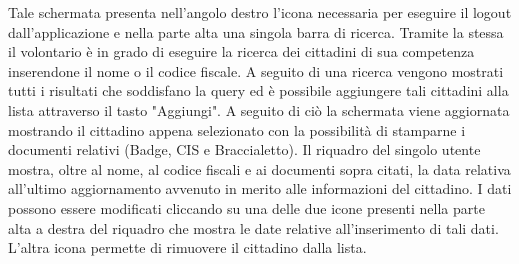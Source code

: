 \documentclass[12pt,a4paper,twoside,openright,titlepage]{book}
\begin{document}
Tale schermata presenta nell'angolo destro l'icona necessaria per eseguire il logout dall'applicazione e nella parte alta una singola barra di ricerca. Tramite la stessa il volontario è in grado di eseguire la ricerca dei cittadini di sua competenza inserendone il nome o il codice fiscale. A seguito di una ricerca vengono mostrati tutti i risultati che soddisfano la query ed è possibile aggiungere tali cittadini alla lista attraverso il tasto "Aggiungi". A seguito di ciò la schermata viene aggiornata mostrando il cittadino appena selezionato con la possibilità di stamparne i documenti relativi (Badge, CIS e Braccialetto). Il riquadro del singolo utente mostra, oltre al nome, al codice fiscali e ai documenti sopra citati, la data relativa all'ultimo aggiornamento avvenuto in merito alle informazioni del cittadino. I dati possono essere modificati cliccando su una delle due icone presenti nella parte alta a destra del riquadro che mostra le date relative all'inserimento di tali dati. L'altra icona permette di rimuovere il cittadino dalla lista.
\end{document}
